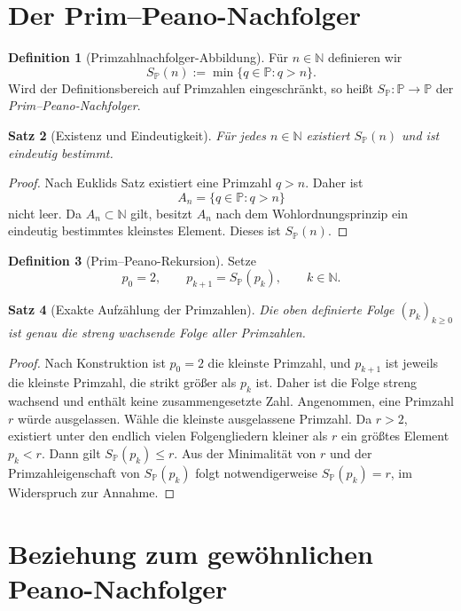 \documentclass[11pt]{article}
\newtheorem{theorem}{Satz}[section]
\theoremstyle{definition}
\newtheorem{definition}[theorem]{Definition}
\newcommand{\N}{\mathbb{N}}
\newcommand{\Pp}{\mathbb{P}}
\newcommand{\SP}{S_{\!\Pp}}
\begin{document}
\section{Der Prim--Peano-Nachfolger}

\begin{definition}[Primzahlnachfolger-Abbildung]
Für $n\in\N$ definieren wir
\[
\boxed{\SP(n):=\min\{q\in\Pp:q>n\}.}
\]
Wird der Definitionsbereich auf Primzahlen eingeschränkt, so heißt $\SP:\Pp\to\Pp$ der \emph{Prim--Peano-Nachfolger}.
\end{definition}

\begin{theorem}[Existenz und Eindeutigkeit]
Für jedes $n\in\N$ existiert $\SP(n)$ und ist eindeutig bestimmt.
\end{theorem}

\begin{proof}
Nach Euklids Satz existiert eine Primzahl $q>n$. Daher ist
\[
A_n=\{q\in\Pp:q>n\}
\]
nicht leer. Da $A_n\subset\N$ gilt, besitzt $A_n$ nach dem Wohlordnungsprinzip ein eindeutig bestimmtes kleinstes Element. Dieses ist $\SP(n)$.
\end{proof}

\begin{definition}[Prim--Peano-Rekursion]
Setze
\[
p_0=2,
\qquad
p_{k+1}=\SP(p_k),\qquad k\in\N.
\]
\end{definition}

\begin{theorem}[Exakte Aufzählung der Primzahlen]
Die oben definierte Folge $(p_k)_{k\ge0}$ ist genau die streng wachsende Folge aller Primzahlen.
\end{theorem}

\begin{proof}
Nach Konstruktion ist $p_0=2$ die kleinste Primzahl, und $p_{k+1}$ ist jeweils die kleinste Primzahl, die strikt größer als $p_k$ ist. Daher ist die Folge streng wachsend und enthält keine zusammengesetzte Zahl. Angenommen, eine Primzahl $r$ würde ausgelassen. Wähle die kleinste ausgelassene Primzahl. Da $r>2$, existiert unter den endlich vielen Folgengliedern kleiner als $r$ ein größtes Element $p_k<r$. Dann gilt $\SP(p_k)\le r$. Aus der Minimalität von $r$ und der Primzahleigenschaft von $\SP(p_k)$ folgt notwendigerweise $\SP(p_k)=r$, im Widerspruch zur Annahme.
\end{proof}

\section{Beziehung zum gewöhnlichen Peano-Nachfolger}
\end{document}
